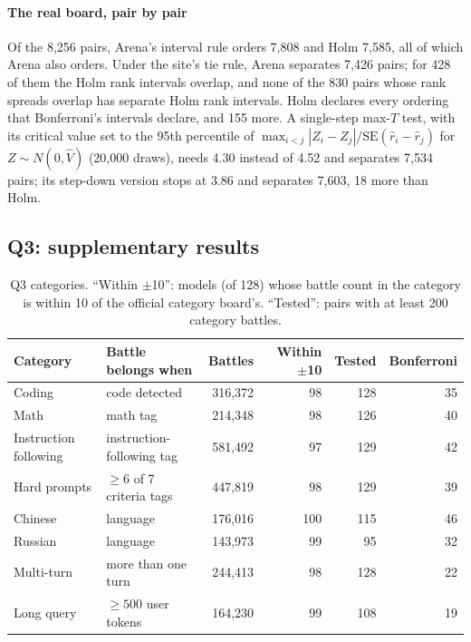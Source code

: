 \documentclass[12pt]{article}
\newcommand{\SE}{\mathrm{SE}}
\begin{document}
\paragraph{The real board, pair by pair} Of the 8,256 pairs, Arena's interval rule orders 7,808 and Holm 7,585, all of which Arena also orders. Under the site's tie rule, Arena separates 7,426 pairs; for 428 of them the Holm rank intervals overlap, and none of the 830 pairs whose rank spreads overlap has separate Holm rank intervals. Holm declares every ordering that Bonferroni's intervals declare, and 155 more. A single-step max-$T$ test, with its critical value set to the 95th percentile of $\max_{i<j} |Z_i - Z_j| / \SE(\hat r_i - \hat r_j)$ for $Z \sim N(0, \hat V)$ (20,000 draws), needs 4.30 instead of 4.52 and separates 7,534 pairs; its step-down version \citep{romano2005exact} stops at 3.86 and separates 7,603, 18 more than Holm.

\FloatBarrier
\subsection{Q3: supplementary results}\label{app:q3}

\begin{table}[!ht]
\centering\small
\caption{Q3 categories. ``Within $\pm$10'': models (of 128) whose battle count in the category is within 10 of the official category board's. ``Tested'': pairs with at least 200 category battles.}\label{tab:cats}
\begin{tabular}{@{}llrrrr@{}}
\toprule
Category & Battle belongs when & Battles & Within $\pm$10 & Tested & Bonferroni \\
\midrule
Coding & code detected & 316,372 & 98 & 128 & 35 \\
Math & math tag & 214,348 & 98 & 126 & 40 \\
Instruction following & instruction-following tag & 581,492 & 97 & 129 & 42 \\
Hard prompts & $\ge 6$ of 7 criteria tags & 447,819 & 98 & 129 & 39 \\
Chinese & language & 176,016 & 100 & 115 & 46 \\
Russian & language & 143,973 & 99 & 95 & 32 \\
Multi-turn & more than one turn & 244,413 & 98 & 128 & 22 \\
Long query & $\ge 500$ user tokens & 164,230 & 99 & 108 & 19 \\
\bottomrule
\end{tabular}
\end{table}
\end{document}
